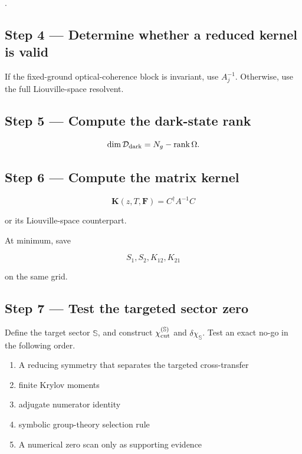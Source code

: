 \documentclass[
  10pt,
  a4paper,
]{article}
\providecommand{\tightlist}{%
  \setlength{\itemsep}{0pt}\setlength{\parskip}{0pt}}
\begin{document}
.

\subsection{Step 4 --- Determine whether a reduced kernel is
valid}\label{step-4-determine-whether-a-reduced-kernel-is-valid}

If the fixed-ground optical-coherence block is invariant, use
\(A_j^{-1}\). Otherwise, use the full Liouville-space resolvent.

\subsection{Step 5 --- Compute the dark-state
rank}\label{step-5-compute-the-dark-state-rank}

\[
\dim\mathcal D_{\rm dark}
=N_g-\operatorname{rank}\Omega.
\]

\subsection{Step 6 --- Compute the matrix
kernel}\label{step-6-compute-the-matrix-kernel}

\[
\mathbf K(z,T,\mathbf F)
=C^\dagger A^{-1}C
\]

or its Liouville-space counterpart.

At minimum, save

\[
S_1,S_2,K_{12},K_{21}
\]

on the same grid.

\subsection{Step 7 --- Test the targeted sector
zero}\label{step-7-test-the-targeted-sector-zero}

Define the target sector \(\mathbb S\), and construct
\(\chi_{\rm cut}^{(\mathbb S)}\) and \(\delta\chi_{\mathbb S}\). Test an
exact no-go in the following order.

\begin{enumerate}
\def\labelenumi{\arabic{enumi}.}
\tightlist
\item
  A reducing symmetry that separates the targeted cross-transfer
\item
  finite Krylov moments
\item
  adjugate numerator identity
\item
  symbolic group-theory selection rule
\item
  A numerical zero scan only as supporting evidence
\end{enumerate}
\end{document}
